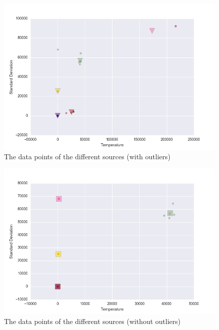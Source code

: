 \documentclass{article}
\begin{document}
\begin{figure}[!ht]
  \caption{The data points of the different sources (with outliers)}
  \label{fig:allsourcesmeans-with-outliers}
  \centering
    \includegraphics[width=1.0\textwidth]{allsourcesmeans_with_outliers}
\end{figure}

\begin{figure}[!ht]
  \caption{The data points of the different sources (without outliers)}
  \label{fig:allsourcesmeans-no-outliers}
  \centering
    \includegraphics[width=1.0\textwidth]{allsourcesmeans_no_outliers}
\end{figure}
\end{document}
